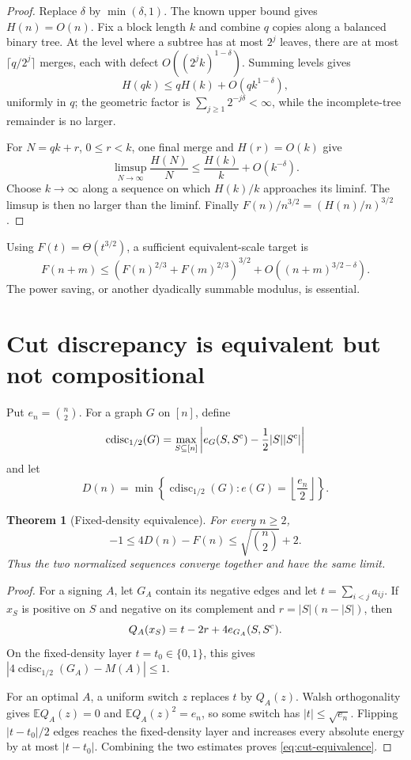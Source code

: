 \documentclass[11pt]{article}
\newcommand{\E}{\mathbb E}
\newtheorem{theorem}{Theorem}[section]
\theoremstyle{definition}
\theoremstyle{remark}
\begin{document}
\begin{proof}
Replace $\delta$ by $\min(\delta,1)$.  The known upper bound gives
$H(n)=O(n)$.  Fix a block length $k$ and combine $q$ copies along a balanced
binary tree.  At the level where a subtree has at most $2^j$ leaves, there
are at most $\lceil q/2^j\rceil$ merges, each with defect
$O((2^jk)^{1-\delta})$.  Summing levels gives
\[
 H(qk)\le qH(k)+O(qk^{1-\delta}),
\]
uniformly in $q$; the geometric factor is
$\sum_{j\ge1}2^{-j\delta}<\infty$, while the incomplete-tree remainder is
no larger.

For $N=qk+r$, $0\le r<k$, one final merge and $H(r)=O(k)$ give
\[
 \limsup_{N\to\infty}\frac{H(N)}N
 \le\frac{H(k)}k+O(k^{-\delta}).
\]
Choose $k\to\infty$ along a sequence on which $H(k)/k$ approaches its
liminf.  The limsup is then no larger than the liminf.  Finally
$F(n)/n^{3/2}=(H(n)/n)^{3/2}$.
\end{proof}

Using $F(t)=\Theta(t^{3/2})$, a sufficient equivalent-scale target is
\begin{equation}
 F(n+m)\le
 \left(F(n)^{2/3}+F(m)^{2/3}\right)^{3/2}
 +O((n+m)^{3/2-\delta}).                                \label{eq:Ftarget}
\end{equation}
The power saving, or another dyadically summable modulus, is essential.

\section{Cut discrepancy is equivalent but not compositional}

Put $e_n=\binom n2$.  For a graph $G$ on $[n]$, define
\[
 \operatorname{cdisc}_{1/2}(G)=
 \max_{S\subseteq[n]}
 \left|e_G(S,S^{\rm c})-\frac12|S||S^{\rm c}|\right|
\]
and let
\[
 D(n)=\min\left\{\operatorname{cdisc}_{1/2}(G):
 e(G)=\left\lfloor\frac{e_n}{2}\right\rfloor\right\}.
\]

\begin{theorem}[Fixed-density equivalence]
For every $n\ge2$,
\begin{equation}
 -1\le4D(n)-F(n)\le\sqrt{\binom n2}+2.                 \label{eq:cut-equivalence}
\end{equation}
Thus the two normalized sequences converge together and have the same limit.
\end{theorem}

\begin{proof}
For a signing $A$, let $G_A$ contain its negative edges and let
$t=\sum_{i<j}a_{ij}$.  If $x_S$ is positive on $S$ and negative on its
complement and $r=|S|(n-|S|)$, then
\[
 Q_A(x_S)=t-2r+4e_{G_A}(S,S^{\rm c}).
\]
On the fixed-density layer $t=t_0\in\{0,1\}$, this gives
$|4\operatorname{cdisc}_{1/2}(G_A)-M(A)|\le1$.

For an optimal $A$, a uniform switch $z$ replaces $t$ by $Q_A(z)$.
Walsh orthogonality gives $\E Q_A(z)=0$ and
$\E Q_A(z)^2=e_n$, so some switch has $|t|\le\sqrt{e_n}$.  Flipping
$|t-t_0|/2$ edges reaches the fixed-density layer and increases every
absolute energy by at most $|t-t_0|$.  Combining the two estimates proves
\eqref{eq:cut-equivalence}.
\end{proof}
\end{document}
